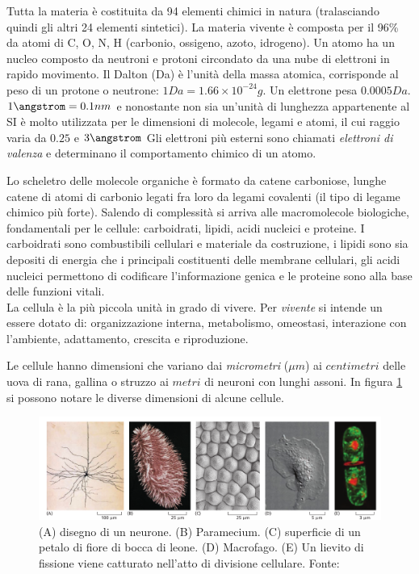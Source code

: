 \par Tutta la materia è costituita da 94 elementi chimici in natura\supercite{elementiNaturaWiki} (tralasciando quindi gli altri 24 elementi sintetici). La materia vivente è composta per il 96\% da atomi di C, O, N, H (carbonio, ossigeno, azoto, idrogeno). Un atomo ha un nucleo composto da neutroni e protoni circondato da una nube di elettroni in rapido movimento. Il Dalton (Da) è l'unità della massa atomica, corrisponde al peso di un protone o neutrone: $1 Da = 1.66 \times 10^{-24}g$. Un elettrone pesa $0.0005 Da$. $1 \angstrom = 0.1nm$ e nonostante non sia un'unità di lunghezza appartenente al SI è molto utilizzata per le dimensioni di molecole, legami e atomi, il cui raggio varia da $0.25$ e $3 \angstrom$
Gli elettroni più esterni sono chiamati \textit{elettroni di valenza} e determinano il comportamento chimico di un atomo.

\par Lo scheletro delle molecole organiche è formato da catene carboniose, lunghe catene di atomi di carbonio legati fra loro da legami covalenti (il tipo di legame chimico più forte). Salendo di complessità si arriva alle macromolecole biologiche, fondamentali per le cellule: carboidrati, lipidi, acidi nucleici e proteine. I carboidrati sono combustibili cellulari e materiale da costruzione, i lipidi sono sia depositi di energia che i principali costituenti delle membrane cellulari, gli acidi nucleici permettono di codificare l'informazione genica e le proteine sono alla base delle funzioni vitali.\\

La cellula è la più piccola unità in grado di vivere. Per \textit{vivente} si intende un essere dotato di: organizzazione interna, metabolismo, omeostasi, interazione con l'ambiente, adattamento, crescita e riproduzione.

\par Le cellule hanno dimensioni che variano dai \textit{micrometri} ($\mu m$) ai $centimetri$ delle uova di rana, gallina o struzzo ai $metri$ di neuroni con lunghi assoni. In figura \ref{fig:cellule-dimensioni} si possono notare le diverse dimensioni di alcune cellule.

\begin{figure}[!h]
	\centering
	\includegraphics[scale=0.5] {images/cellule-dimensioni.png}
	\caption{(A) disegno di un neurone. (B) Paramecium. (C) superficie di un petalo di fiore di bocca di leone. (D) Macrofago. (E) Un lievito di fissione viene catturato nell'atto di divisione cellulare. Fonte: \cite{alberts2018essential}}
	\label{fig:cellule-dimensioni}
\end{figure}

